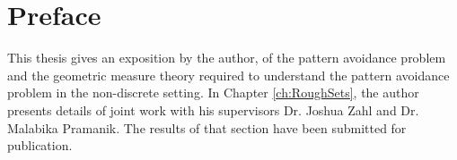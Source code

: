 
\chapter{Preface}

This thesis gives an exposition by the author, of the pattern avoidance problem and the geometric measure theory required to understand the pattern avoidance problem in the non-discrete setting. In Chapter \ref{ch:RoughSets}, the author presents details of joint work with his supervisors Dr. Joshua Zahl and Dr. Malabika Pramanik. The results of that section have been submitted for publication.